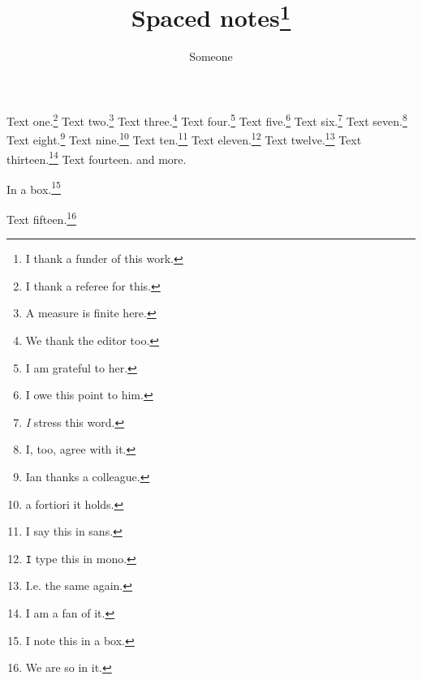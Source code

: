 \documentclass[fontsize=11]{scrartcl}
\title{Spaced notes\thanks{I thank a funder of this work.}}
\author{Someone}
\begin{document}
\maketitle
Text one.\footnote{I thank a referee for this.}
Text two.\footnote{A measure is finite here.}
Text three.\footnote{We thank the editor too.}
Text four.\footnote{I am grateful to her.}
Text five.\footnote[20]{I owe this point to him.}
Text six.\footnote{\emph{I} stress this word.}
Text seven.\footnote{I, too, agree with it.}
Text eight.\footnote{Ian thanks a colleague.}
Text nine.\footnote{a fortiori it holds.}
Text ten.\footnote{\textsf{I} say this in sans.}
Text eleven.\footnote{\texttt{I} type this in mono.}
Text twelve.\footnote{I.e. the same again.}
Text thirteen.\footnote[1000]{I am a fan of it.}
Text fourteen.\footnotemark{} and more.

\begin{minipage}{0.8\textwidth}
In a box.\footnote{I note this in a box.}
\end{minipage}

Text fifteen.\footnote{We are so in it.}
\end{document}
